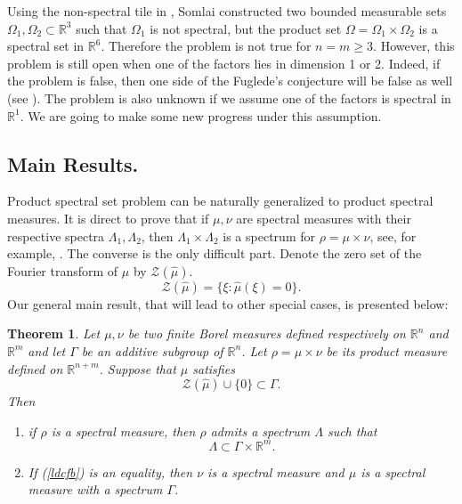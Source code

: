 \documentclass[reqno,a4paper,12pt]{amsart}
\numberwithin{equation}{section}
\newcommand{\R}{{\mathbb R}}
\newcounter{rem}
\newtheorem{theorem}{Theorem}[section]
\theoremstyle{remark}
\numberwithin{equation}{section}
\def\R{\mathbb{R}}
\begin{document}
Using the non-spectral tile in \cite{KM-FM}, Somlai \cite{S-ARX} constructed two bounded measurable sets $\Omega_1, \Omega_2\subset \R^3$  such that $\Omega_1$ is not spectral, but the product set $\Omega=\Omega_1\times \Omega_2$ is a spectral set in $\mathbb{R}^{6}$. Therefore the problem is not true for $n = m \ge 3.$  However, this problem is still open when one of the factors lies in dimension 1 or 2. Indeed, if the problem is false, then one side of the Fuglede's conjecture will be false as well (see \cite{KMN-BHM}). The problem is also unknown if we assume one of the factors is spectral in $\R^1$. We are going to make some new progress under this assumption. 

\subsection{Main Results.} Product spectral set problem can be naturally generalized to product spectral measures. It is direct to prove that if $\mu,\nu$ are spectral measures with their respective spectra $\Lambda_1,\Lambda_2$, then $\Lambda_1\times\Lambda_2$ is a spectrum for $\rho  = \mu\times \nu$, see, for example, \cite[Proposition 2.2]{LW-ACHA}. 
The converse is the only difficult part. Denote the zero set of the Fourier transform of $\mu$ by ${\mathcal Z}(\widehat{\mu})$. 
$$
\mathcal{Z}(\widehat{\mu}) = \{\xi: \widehat{\mu}(\xi) = 0\}.
$$
Our general main result, that will lead to other special cases, is presented below:

\begin{theorem}\label{spectral}
Let $\mu,\nu$ be two finite Borel  measures defined respectively on $\R^{n}$ and $\R^{m}$ and let $\Gamma$ be an {additive} subgroup of $\R^{n}$.  Let $\rho=\mu\times \nu$ be its product measure defined on $\R^{n+m}$. Suppose that  $\mu$ satisfies
\begin{equation}\label{ldcfb}
\mathcal{Z}(\widehat{\mu})\cup\{0\}  \subset  \Gamma.
\end{equation}
Then  \begin{enumerate}
\item if $\rho$ is a spectral measure, then $\rho$ admits a spectrum $\Lambda$
such that
$$
\Lambda \subset \Gamma \times \R^m.
$$
\item If (\ref{ldcfb}) is an equality, then $\nu$ is a spectral measure and $\mu$ is a spectral measure with a spectrum  $\Gamma$.
\end{enumerate}
\end{theorem}
\end{document}

